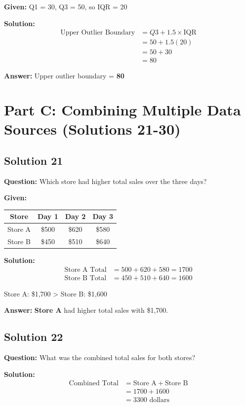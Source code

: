\documentclass[12pt,a4paper]{article}
\begin{document}
\textbf{Given:} Q1 = 30, Q3 = 50, so IQR = 20

\textbf{Solution:}
\begin{align*}
\text{Upper Outlier Boundary} &= Q3 + 1.5 \times \text{IQR} \\
&= 50 + 1.5(20) \\
&= 50 + 30 \\
&= 80
\end{align*}

\textbf{Answer:} Upper outlier boundary = \textbf{80}

\newpage

\section{Part C: Combining Multiple Data Sources (Solutions 21-30)}

\subsection*{Solution 21}
\textbf{Question:} Which store had higher total sales over the three days?

\textbf{Given:}
\begin{center}
\begin{tabular}{|c|c|c|c|}
\hline
Store & Day 1 & Day 2 & Day 3 \\
\hline
Store A & \$500 & \$620 & \$580 \\
Store B & \$450 & \$510 & \$640 \\
\hline
\end{tabular}
\end{center}

\textbf{Solution:}
\begin{align*}
\text{Store A Total} &= 500 + 620 + 580 = 1700 \\
\text{Store B Total} &= 450 + 510 + 640 = 1600
\end{align*}

Store A: \$1,700 > Store B: \$1,600

\textbf{Answer:} \textbf{Store A} had higher total sales with \$1,700.

\subsection*{Solution 22}
\textbf{Question:} What was the combined total sales for both stores?

\textbf{Solution:}
\begin{align*}
\text{Combined Total} &= \text{Store A} + \text{Store B} \\
&= 1700 + 1600 \\
&= 3300 \text{ dollars}
\end{align*}
\end{document}
